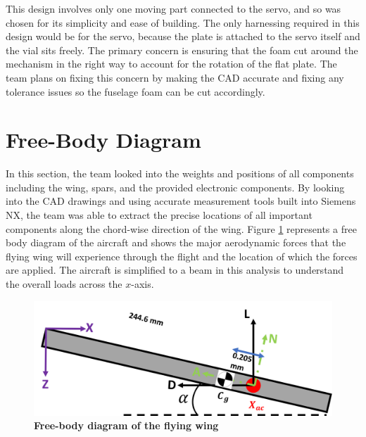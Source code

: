     This design involves only one moving part connected to the servo, and so was chosen for its simplicity and ease of building. The only harnessing required in this design would be for the servo, because the plate is attached to the servo itself and the vial sits freely. The primary concern is ensuring that the foam cut around the mechanism in the right way to account for the rotation of the flat plate. The team plans on fixing this concern by making the CAD accurate and fixing any tolerance issues so the fuselage foam can be cut accordingly.
    
\section{Free-Body Diagram}
    
    In this section, the team looked into the weights and positions of all components including the wing, spars, and the provided electronic components. By looking into the CAD drawings and using accurate measurement tools built into Siemens NX, the team was able to extract the precise locations of all important components along the chord-wise direction of the wing. Figure \ref{fig:free_body} represents a free body diagram of the aircraft and shows the major aerodynamic forces that the flying wing will experience through the flight and the location of which the forces are applied. The aircraft is simplified to a beam in this analysis to understand the overall loads across the $x$-axis.
    
    \begin{figure}[H]
        \centering
        \includegraphics[scale=0.6]{homeworks/homework4/report/Figure/fbd.png}
        \caption{\textbf{Free-body diagram of the flying wing}}
        \label{fig:free_body}
    \end{figure}
    
